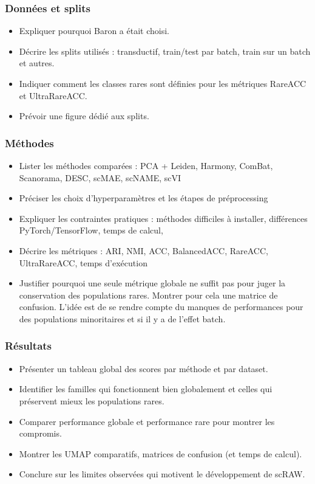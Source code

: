 \subsubsection{Données et splits}
\begin{itemize}
  \item Expliquer pourquoi Baron a était choisi. 
  \item Décrire les splits utilisés : transductif, train/test par batch, train sur un batch et autres.
  \item Indiquer comment les classes rares sont définies pour les métriques RareACC et UltraRareACC.
  \item Prévoir une figure dédié aux splits.
\end{itemize}

\subsubsection{Méthodes}
\begin{itemize}
  \item Lister les méthodes comparées : PCA + Leiden, Harmony, ComBat, Scanorama, DESC, scMAE, scNAME, scVI
  \item Préciser les choix d'hyperparamètres et les étapes de préprocessing
  \item Expliquer les contraintes pratiques : méthodes difficiles à installer, différences PyTorch/\allowbreak TensorFlow, temps de calcul,
  \item Décrire les métriques : ARI, NMI, ACC, BalancedACC, RareACC, UltraRareACC, temps d'exécution
  \item Justifier pourquoi une seule métrique globale ne suffit pas pour juger la conservation des populations rares. Montrer pour cela une matrice de confusion. L'idée est de se rendre compte du manques de performances pour des populations minoritaires et si il y a de l'effet batch.
\end{itemize}

\subsubsection{Résultats}
\begin{itemize}
  \item Présenter un tableau global des scores par méthode et par dataset.
  \item Identifier les familles qui fonctionnent bien globalement et celles qui préservent mieux les populations rares.
  \item Comparer performance globale et performance rare pour montrer les compromis.
  \item Montrer les UMAP comparatifs, matrices de confusion  (et temps de calcul).
  \item Conclure sur les limites observées qui motivent le développement de scRAW.
\end{itemize}

